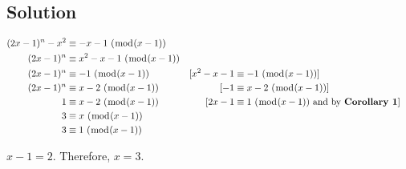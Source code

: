 \documentclass[11pt]{article}
\begin{document}
\subsection*{Solution}
\begin{align*}
    (2x - 1)^n - x^2 &\equiv -x - 1\ (\bmod{(x-1)})\\
    (2x - 1)^n &\equiv x^2 - x - 1\ (\bmod{(x-1)})\\
    (2x - 1)^n &\equiv -1\ (\bmod{(x-1)}) &[x^2 - x - 1 &\equiv -1\ (\bmod{(x-1)})]\\
    (2x - 1)^n &\equiv x - 2\ (\bmod{(x-1)}) &[-1 &\equiv x - 2\ (\bmod{(x-1)})]\\
    1 &\equiv x - 2\ (\bmod{(x-1)}) &[2x - 1 &\equiv 1\ (\bmod{(x-1)}) \text{ and by \textbf{Corollary 1}}]\\
    3 &\equiv x\ (\bmod{(x-1)})\\
    3 &\equiv 1\ (\bmod{(x-1)})
\end{align*}

$x - 1 = 2$. Therefore, $x = 3$.
\end{document}
